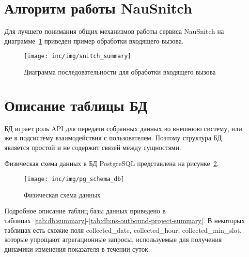 \section{Алгоритм работы NauSnitch}

Для лучшего понимания общих механизмов работы сервиса NauSnitch
на диаграмме~\ref{pic:uml-seq-summary} приведен пример обработки входящего вызова.

\begin{figure}[ht]
    \centering
    \texttt{[image: inc/img/snitch\_summary]}
    \caption{Диаграмма последовательности для обработки входящего вызова}
    \label{pic:uml-seq-summary}
\end{figure}



\section{Описание таблицы БД} %

БД играет роль API для передачи собранных данных во внешнюю систему,
или же в подсистему взаимодействия с пользователем.
Поэтому структура БД является простой и не содержит связей между сущностями.

Физическая схема данных в БД PostgreSQL представлена на рисунке~\ref{pic:schema-db}. %

\begin{figure}[!ht]
    \centering
    \texttt{[image: inc/img/pg\_schema\_db]}
    \caption{Физическая схема данных}
    \label{pic:schema-db}
\end{figure}

Подробное описание таблиц базы данных приведено в таблицах~\ref{tab:db:summary}-\ref{tab:db:ns-outbound-project-summary}.
В некоторых таблицах есть схожие поля collected\_date, collected\_hour, collected\_min\_slot,
которые упрощают агрегационные запросы, используемые для получения динамики изменения показателя в течении суток.


